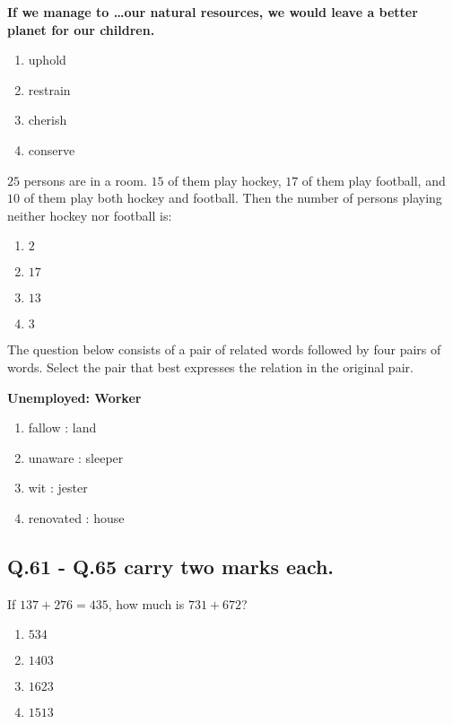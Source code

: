    \textbf{ If we manage to \dots  our natural resources, we would leave a better planet for our children.}

    \begin{enumerate}
        \item uphold
        \item restrain
        \item cherish
        \item conserve
    \end{enumerate}

    \item $25$ persons are in a room. $15$ of them play hockey, $17$ of them play football, and $10$ of them play both hockey and football. Then the number of persons playing neither hockey nor football is:

    \begin{enumerate}
        \item $2$
        \item $17$
        \item $13$
        \item $3$
    \end{enumerate}

    \item The question below consists of a pair of related words followed by four pairs of words. Select the pair that best expresses the relation in the original pair.

    \textbf{Unemployed: Worker}

    \begin{enumerate}
        \item fallow : land
        \item unaware : sleeper
        \item wit : jester
        \item renovated : house
    \end{enumerate}


    \subsection{ Q.61 - Q.65 carry two marks each.}


\item  If $137 + 276 = 435$, how much is $731 + 672$?

    \begin{enumerate}
        \item $534$
        \item $1403$
        \item $1623$
        \item $1513$
    \end{enumerate}





